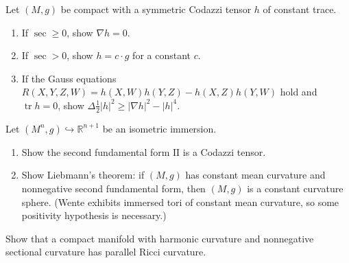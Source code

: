 \begin{remark}
  \label{rem:pet-ch9-exercise-9-6-11}
  Let $(M,g)$ be compact with a symmetric Codazzi tensor $h$ of constant
  trace.
  \begin{enumerate}
    \item[(1)] If $\sec\ge0$, show $\nabla h=0$.
    \item[(2)] If $\sec>0$, show $h=c\cdot g$ for a constant $c$.
    \item[(3)] If the Gauss equations $R(X,Y,Z,W)=h(X,W)h(Y,Z)-h(X,Z)h(Y,W)$
      hold and $\operatorname{tr}h=0$, show
      $\Delta\tfrac12|h|^2\ge|\nabla h|^2-|h|^4$.
  \end{enumerate}
\end{remark}

\begin{remark}[Exercise 9.6.12]
  \label{rem:pet-ch9-exercise-9-6-12}
  Let $(M^n,g)\hookrightarrow\mathbb{R}^{n+1}$ be an isometric immersion.
  \begin{enumerate}
    \item[(1)] Show the second fundamental form $\mathrm{II}$ is a Codazzi
      tensor.
    \item[(2)] Show Liebmann's theorem: if $(M,g)$ has constant mean curvature
      and nonnegative second fundamental form, then $(M,g)$ is a constant
      curvature sphere. (Wente exhibits immersed tori of constant mean
      curvature, so some positivity hypothesis is necessary.)
  \end{enumerate}
\end{remark}

\begin{remark}
  \label{rem:pet-ch9-exercise-9-6-13}
  Show that a compact manifold with harmonic curvature and nonnegative
  sectional curvature has parallel Ricci curvature.
\end{remark}

